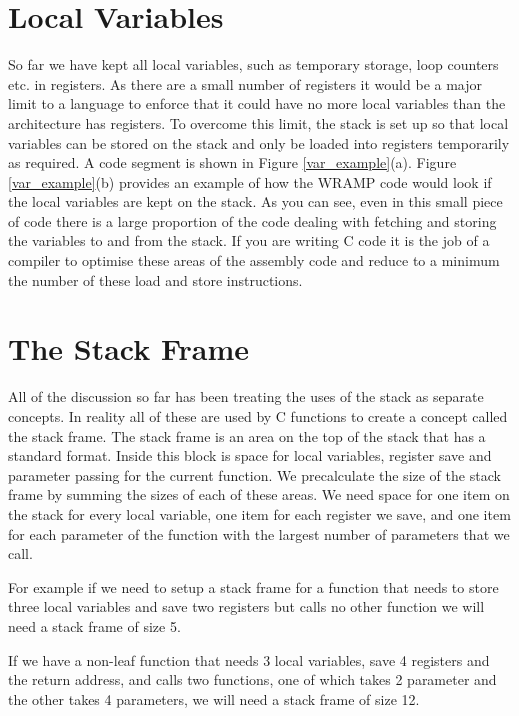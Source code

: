 \section{Local Variables}
So far we have kept all local variables, such as temporary storage,
loop counters etc. in registers. As there are a small number of
registers it would be a major limit to a language to enforce that it
could have no more local variables than the architecture has
registers. To overcome this limit, the stack is set up so that local
variables can be stored on the stack and only be loaded into registers
temporarily as required. A code segment is shown in Figure
\ref{var_example}(a). Figure \ref{var_example}(b) provides an example
of how the WRAMP code would look if the local variables are kept on the
stack. As you can see, even in this small piece of code there is a
large proportion of the code dealing with fetching and storing the
variables to and from the stack. If you are writing C code it is the
job of a compiler to optimise these areas of the assembly code and
reduce to a minimum the number of these load and store instructions.

\section{The Stack Frame}

All of the discussion so far has been treating the uses of the stack as
separate concepts. In reality all of these are used by C functions to create
a concept called the stack frame. The stack frame is an area on the top of the
stack that has a standard format. Inside this block is space for local
variables, register save and parameter passing for the current function. We
precalculate the size of the stack frame by summing the sizes of each of these
areas. We need space for one item on the stack for every local variable, one
item for each register we save, and one item for each parameter of the function
with the largest number of parameters that we call.

For example if we need to setup a stack frame for a function that needs to
store three local variables and save two registers but calls no other function
we will need a stack frame of size 5.

If we have a non-leaf function that needs 3 local variables, save 4 registers
and the return address, and calls two functions, one of which takes 2 parameter
and the other takes 4 parameters, we will need a stack frame of size 12.

